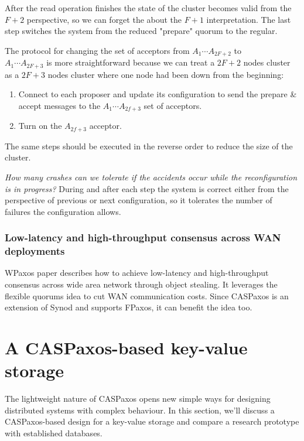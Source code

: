 \documentclass[12pt]{article}
\theoremstyle{definition}
\begin{document}
After the read operation finishes the state of the cluster becomes valid from the $F+2$ perspective, so we can forget the about the $F+1$ interpretation. The last step switches the system from the reduced "prepare" quorum to the regular.

The protocol for changing the set of acceptors from $A_1 \cdots A_{2F+2}$ to \\
$A_1 \cdots A_{2F+3}$ is more straightforward because we can treat a $2F+2$ nodes cluster as a $2F+3$ nodes cluster where one node had been down from the beginning:
\begin{enumerate}
  \item Connect to each proposer and update its configuration to send the prepare \& accept messages to the $A_1 \cdots A_{2f+3}$ set of acceptors.
  \item Turn on the $A_{2f+3}$ acceptor.
\end{enumerate}

The same steps should be executed in the reverse order to reduce the size of the cluster.

{\it How many crashes can we tolerate if the accidents occur while the reconfiguration is in progress?} During and after each step the system is correct either from the perspective of previous or next configuration, so it tolerates the number of failures the configuration allows.

\subsubsection{Low-latency and high-throughput consensus across WAN deployments}

WPaxos\cite{wpaxos} paper describes how to achieve low-latency and high-throughput consensus across wide area network through object stealing. It leverages the flexible quorums\cite{fpaxos} idea to cut WAN communication costs. Since CASPaxos is an extension of Synod and supports FPaxos, it can benefit the idea too.

\section{A CASPaxos-based key-value storage}

The lightweight nature of CASPaxos opens new simple ways for designing distributed systems with complex behaviour. In this section, we'll discuss a CASPaxos-based design for a key-value storage and compare a research prototype with established databases.
\end{document}
